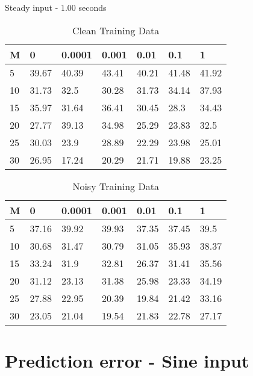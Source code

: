 \documentclass{beamer}
\begin{document}
\begin{frame}{Steady input - $1.00$ seconds}
    \scriptsize
    \begin{table}[!ht]
        \centering
        \begin{tabular}{|l|l|l|l|l|l|l|}
        \hline
            M & 0 & 0.0001 & 0.001 & 0.01 & 0.1 & 1 \\ \hline
            5 & 39.67 & 40.39 & 43.41 & 40.21 & 41.48 & 41.92 \\ \hline
            10 & 31.73 & 32.5 & 30.28 & 31.73 & 34.14 & 37.93 \\ \hline
            15 & 35.97 & 31.64 & 36.41 & 30.45 & 28.3 & 34.43 \\ \hline
            20 & 27.77 & 39.13 & 34.98 & 25.29 & 23.83 & 32.5 \\ \hline
            25 & 30.03 & 23.9 & 28.89 & 22.29 & 23.98 & 25.01 \\ \hline
            30 & 26.95 & 17.24 & 20.29 & 21.71 & 19.88 & 23.25 \\ \hline
        \end{tabular}
        \caption{Clean Training Data}
    \end{table}

    \begin{table}[!ht]
        \centering
        \begin{tabular}{|l|l|l|l|l|l|l|}
        \hline
            M & 0 & 0.0001 & 0.001 & 0.01 & 0.1 & 1 \\ \hline
            5 & 37.16 & 39.92 & 39.93 & 37.35 & 37.45 & 39.5 \\ \hline
            10 & 30.68 & 31.47 & 30.79 & 31.05 & 35.93 & 38.37 \\ \hline
            15 & 33.24 & 31.9 & 32.81 & 26.37 & 31.41 & 35.56 \\ \hline
            20 & 31.12 & 23.13 & 31.38 & 25.98 & 23.33 & 34.19 \\ \hline
            25 & 27.88 & 22.95 & 20.39 & 19.84 & 21.42 & 33.16 \\ \hline
            30 & 23.05 & 21.04 & 19.54 & 21.83 & 22.78 & 27.17 \\ \hline
        \end{tabular}
        \caption{Noisy Training Data}
    \end{table}
\end{frame}


\section{Prediction error - Sine input}
\end{document}

